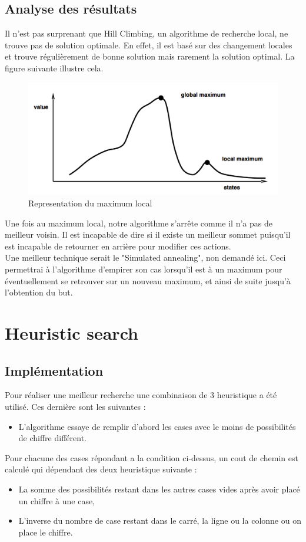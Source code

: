 \documentclass[a4paper,10pt]{article}
\begin{document}
\subsection{Analyse des résultats}
Il n'est pas surprenant que Hill Climbing, un algorithme de recherche local, ne trouve pas de solution optimale. En effet, il est basé sur des changement locales et trouve régulièrement de bonne solution mais rarement la solution optimal. La figure suivante illustre cela.
\begin{figure}[H]
\includegraphics[scale=0.25]{images/hill-climbing.png}
\centering
\caption{Representation du maximum local}
\end{figure}
Une fois au maximum local, notre algorithme s'arrête comme il n'a pas de meilleur voisin. Il est incapable de dire si il existe un meilleur sommet puisqu'il est incapable de retourner en arrière pour modifier ces actions.\\

Une meilleur technique serait le "Simulated annealing", non demandé ici. Ceci permettrai à l'algorithme d'empirer son cas lorsqu'il est à un maximum pour éventuellement se retrouver sur un nouveau maximum, et ainsi de suite jusqu'à l'obtention du but.

 
\section{Heuristic search}

\subsection{Implémentation}

Pour réaliser une meilleur recherche une combinaison de 3 heuristique a été utilisé. Ces dernière sont les suivantes :\\ 

\begin{itemize}
	\item L'algorithme essaye de remplir d'abord les cases avec le moins de possibilités de chiffre différent.
\end{itemize}
Pour chacune des cases répondant a la condition ci-dessus, un cout de chemin est calculé qui dépendant des deux heuristique suivante :
\begin{itemize}
	\item La somme des possibilités restant dans les autres cases vides après avoir placé un chiffre à une case,
	\item L'inverse du nombre de case restant dans le carré, la ligne ou la colonne ou on place le chiffre.
\end{itemize}
\end{document}
